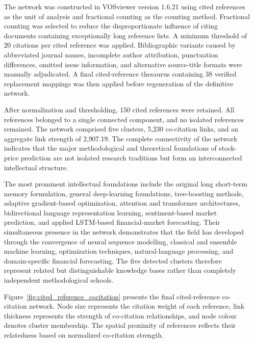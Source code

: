 \documentclass[pdflatex,sn-mathphys-num]{sn-jnl}%
\theoremstyle{thmstyleone}%
\theoremstyle{thmstyletwo}%
\theoremstyle{thmstylethree}%
\begin{document}
The network was constructed in VOSviewer version 1.6.21 using cited
references as the unit of analysis and fractional counting as the counting
method. Fractional counting was selected to reduce the disproportionate
influence of citing documents containing exceptionally long reference lists.
A minimum threshold of 20 citations per cited reference was applied.
Bibliographic variants caused by abbreviated journal names, incomplete author
attribution, punctuation differences, omitted issue information, and
alternative source-title formats were manually adjudicated. A final
cited-reference thesaurus containing 38 verified replacement mappings was
then applied before regeneration of the definitive network.

After normalization and thresholding, 150 cited references were retained.
All references belonged to a single connected component, and no isolated
references remained. The network comprised five clusters, 5,230
co-citation links, and an aggregate link strength of 2,907.19. The complete
connectivity of the network indicates that the major methodological and
theoretical foundations of stock-price prediction are not isolated research
traditions but form an interconnected intellectual structure.

The most prominent intellectual foundations include the original
long short-term memory formulation, general deep-learning foundations,
tree-boosting methods, adaptive gradient-based optimization, attention and
transformer architectures, bidirectional language representation learning,
sentiment-based market prediction, and applied LSTM-based financial-market
forecasting. Their simultaneous presence in the network demonstrates that
the field has developed through the convergence of neural sequence modelling,
classical and ensemble machine learning, optimization techniques,
natural-language processing, and domain-specific financial forecasting.
The five detected clusters therefore represent related but distinguishable
knowledge bases rather than completely independent methodological schools.

Figure~\ref{fig:cited_reference_cocitation} presents the final
cited-reference co-citation network. Node size represents the citation weight
of each reference, link thickness represents the strength of co-citation
relationships, and node colour denotes cluster membership. The spatial
proximity of references reflects their relatedness based on normalized
co-citation strength.
\end{document}

